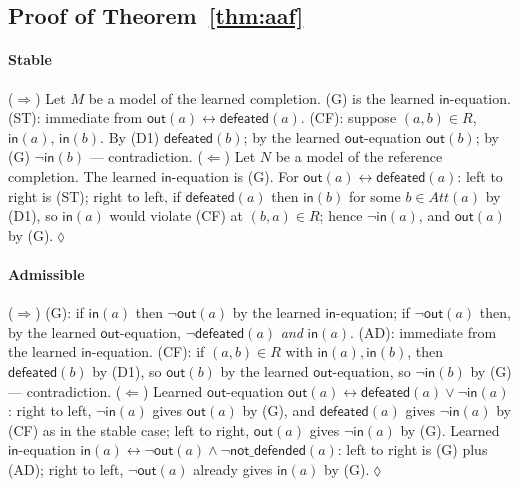 \documentclass[review,12pt]{elsarticle}
\theoremstyle{definition}
\theoremstyle{remark}
\newcommand{\pred}[1]{\textsf{#1}}
\newcommand{\Att}{\mathit{Att}}
\begin{document}
\subsection{Proof of Theorem~\ref{thm:aaf}}

\paragraph{Stable}
($\Rightarrow$) Let $M$ be a model of the learned completion. (G) is the
learned $\pred{in}$-equation. (ST): immediate from
$\pred{out}(a)\leftrightarrow\pred{defeated}(a)$. (CF): suppose $(a,b)\in R$,
$\pred{in}(a)$, $\pred{in}(b)$. By (D1) $\pred{defeated}(b)$; by the learned
$\pred{out}$-equation $\pred{out}(b)$; by (G) $\neg\pred{in}(b)$ ---
contradiction.
($\Leftarrow$) Let $N$ be a model of the reference completion. The learned
$\pred{in}$-equation is (G). For
$\pred{out}(a)\leftrightarrow\pred{defeated}(a)$: left to right is (ST); right
to left, if $\pred{defeated}(a)$ then $\pred{in}(b)$ for some $b\in\Att(a)$
by (D1), so $\pred{in}(a)$ would violate (CF) at $(b,a)\in R$; hence
$\neg\pred{in}(a)$, and $\pred{out}(a)$ by (G).\hfill$\lozenge$

\paragraph{Admissible}
($\Rightarrow$) (G): if $\pred{in}(a)$ then $\neg\pred{out}(a)$ by the learned
$\pred{in}$-equation; if $\neg\pred{out}(a)$ then, by the learned
$\pred{out}$-equation, $\neg\pred{defeated}(a)$ \emph{and} $\pred{in}(a)$.
(AD): immediate from the learned $\pred{in}$-equation. (CF): if $(a,b)\in R$
with $\pred{in}(a),\pred{in}(b)$, then $\pred{defeated}(b)$ by (D1), so
$\pred{out}(b)$ by the learned $\pred{out}$-equation, so $\neg\pred{in}(b)$
by (G) --- contradiction.
($\Leftarrow$) Learned $\pred{out}$-equation
$\pred{out}(a)\leftrightarrow\pred{defeated}(a)\vee\neg\pred{in}(a)$: right to
left, $\neg\pred{in}(a)$ gives $\pred{out}(a)$ by (G), and
$\pred{defeated}(a)$ gives $\neg\pred{in}(a)$ by (CF) as in the stable case;
left to right, $\pred{out}(a)$ gives $\neg\pred{in}(a)$ by (G). Learned
$\pred{in}$-equation
$\pred{in}(a)\leftrightarrow\neg\pred{out}(a)\wedge\neg\pred{not\_defended}(a)$:
left to right is (G) plus (AD); right to left, $\neg\pred{out}(a)$ already
gives $\pred{in}(a)$ by (G).\hfill$\lozenge$
\end{document}
